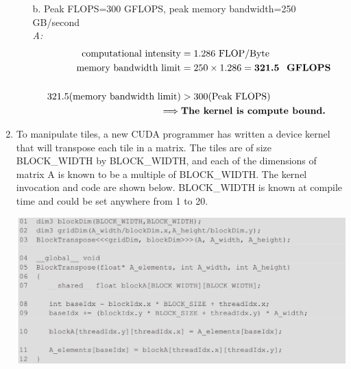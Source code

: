 \begin{enumerate}
\begin{itemize}
                  \item[ b.] Peak FLOPS=300 GFLOPS, peak memory bandwidth=250 GB/second
                        \\ \textsl{A: }
                        \begin{equation*}
                              \begin{aligned}
                                    \text{computational intensity}        & = 1.286 \text{ FLOP/Byte}                          \\
                                    \text{memory bandwidth limit}         & = 250 \times 1.286 = \textbf{321.5 \text{ GFLOPS}} \\\\
                                    321.5 (\text{memory bandwidth limit}) & > 300 (\text{Peak FLOPS})                          \\
                                    \implies                              & \textbf{The kernel is compute bound.}              \\
                              \end{aligned}
                        \end{equation*}
            \end{itemize}
            \pagebreak
      \item To manipulate tiles, a new CUDA programmer has written a device kernel that will transpose each tile in a matrix. The tiles are of size BLOCK\_WIDTH by BLOCK\_WIDTH, and each of the dimensions of matrix A is known to be a multiple of BLOCK\_WIDTH. The kernel invocation and code are shown below. BLOCK\_WIDTH is known at compile time and could be set anywhere from 1 to 20.
            \begin{center}
                  \includegraphics[width=0.9\linewidth]{Images/Memories/blocktranspose.png}
            \end{center}
            \begin{itemize}

\end{itemize}
\end{enumerate}
